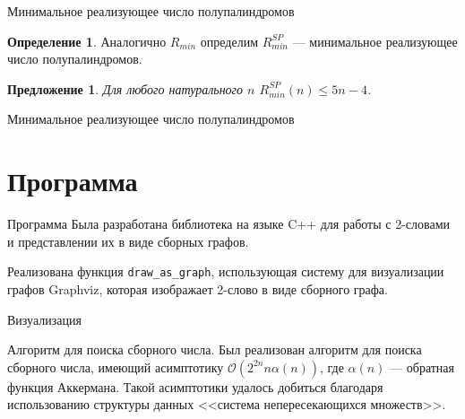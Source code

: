 \documentclass[14pt, aspectratio=169, notheorems]{beamer}
\theoremstyle{plain}
\newtheorem{proposition}[theorem]{Предложение}
\theoremstyle{definition}
\newtheorem{definition}[theorem]{Определение}
\theoremstyle{remark}
\begin{document}
\begin{frame}{Минимальное реализующее число полупалиндромов}
\begin{definition}
    Аналогично $R_{min}$ определим $R_{min}^{SP}$ --- минимальное реализующее число полупалиндромов.
\end{definition}
\begin{proposition}
    Для любого натурального $n$ $R_{min}^{SP}(n) \le 5n - 4$.
\end{proposition}
\end{frame}

\begin{frame}{Минимальное реализующее число полупалиндромов}
    \centering
    
\end{frame}

\section{Программа}
\begin{frame}{Программа}
    Была разработана библиотека на языке C++ для работы с 2-словами и представлении их в виде сборных графов.

    Реализована функция \texttt{draw\_as\_graph}, использующая систему для визуализации графов Graphviz, которая изображает 2-слово в виде сборного графа.
\end{frame}

\begin{frame}{Визуализация}
    \centering
    
\end{frame}

\begin{frame}{Алгоритм для поиска сборного числа.}
    Был реализован алгоритм для поиска сборного числа, имеющий асимптотику $\mathcal{O}(2^{2n} n \alpha(n))$, где $\alpha(n)$ --- обратная функция Аккермана. Такой асимптотики удалось добиться благодаря использованию структуры данных <<система непересекающихся множеств>>.
\end{frame}
\end{document}
